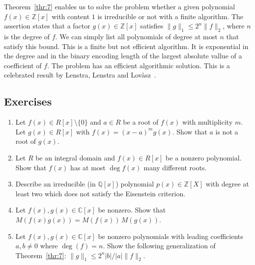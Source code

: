 Theorem~\ref{thr:7} enables us to solve the problem whether a given polynomial $f(x) ∈ℤ[x]$  with content $1$ is irreducible or not with a finite algorithm. The assertion states that a factor $g(x) ∈ℤ[x]$ satisfies $\|g\|_1 ≤ 2^n \|f\|_2$, where $n$ is the degree of $f$. We can simply list all polynomials of degree at most $n$ that satisfy this bound. This is a finite but not efficient algorithm. It is exponential in the degree and in the binary encoding length of the largest absolute vallue of a coefficient of $f$. The problem has an efficient algorithmic solution. This is a celebrated result by Lenstra, Lenstra and Lovàsz~\cite{lenstra1982factoring}.  


\subsection*{Exercises}
\begin{enumerate}
\item Let $f(x) ∈ R[x]\setminus\{0\}$ and $a ∈R$ be a root of $f(x)$ with multiplicity $m$. Let $g(x) ∈ R[x] $ with $f(x) = (x-a)^m g(x)$. Show that $a$ is not a root of $g(x)$.
\item Let $R$ be an integral domain and  $f(x) ∈ R[x]$ be a nonzero polynomial. Show that $f(x)$ has at most $\deg f(x)$ many different roots.
\item Describe an irreducible (in $ℚ[x]$) polynomial $p(x) ∈ℤ[X]$ with degree at least two which does not satisfy the Eisenstein criterion.
\item Let  $f(x),g(x) ∈ℂ[x]$ be nonzero. Show that $M(f(x)g(x)) = M(f(x)) \, M (g(x))$.
\item Let $f(x),g(x) ∈ℂ[x]$ be nonzero polynomials with leading coefficients $a,b ≠0$ where $\deg (f) = n$. Show the following generalization of Theorem~\ref{thr:7}: $\|g\|_1 ≤ 2^n |b| / |a| \|f\|_2$. 
\end{enumerate}



